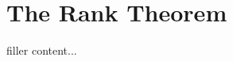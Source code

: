 \documentclass[../../templates/section]{subfiles}
\begin{document}
\section{The Rank Theorem}\label{sec:the-rank-theorem}

filler content...
\end{document}
